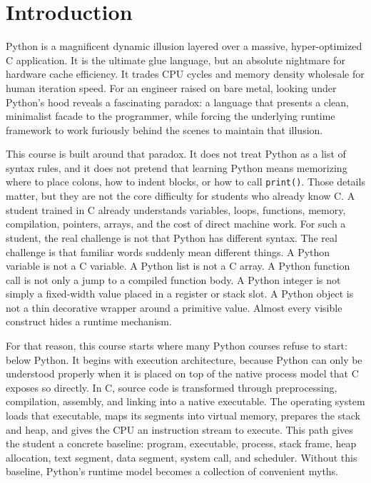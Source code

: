 \documentclass[a4paper,twoside]{report}
\begin{document}
\tableofcontents

\clearpage

\chapter{Introduction}

Python is a magnificent dynamic illusion layered over a massive, hyper-optimized C application. It is the ultimate glue language, but an absolute nightmare for hardware cache efficiency. It trades CPU cycles and memory density wholesale for human iteration speed. For an engineer raised on bare metal, looking under Python's hood reveals a fascinating paradox: a language that presents a clean, minimalist facade to the programmer, while forcing the underlying runtime framework to work furiously behind the scenes to maintain that illusion.

This course is built around that paradox. It does not treat Python as a list of syntax rules, and it does not pretend that learning Python means memorizing where to place colons, how to indent blocks, or how to call \texttt{print()}. Those details matter, but they are not the core difficulty for students who already know C. A student trained in C already understands variables, loops, functions, memory, compilation, pointers, arrays, and the cost of direct machine work. For such a student, the real challenge is not that Python has different syntax. The real challenge is that familiar words suddenly mean different things. A Python variable is not a C variable. A Python list is not a C array. A Python function call is not only a jump to a compiled function body. A Python integer is not simply a fixed-width value placed in a register or stack slot. A Python object is not a thin decorative wrapper around a primitive value. Almost every visible construct hides a runtime mechanism.

For that reason, this course starts where many Python courses refuse to start: below Python. It begins with execution architecture, because Python can only be understood properly when it is placed on top of the native process model that C exposes so directly. In C, source code is transformed through preprocessing, compilation, assembly, and linking into a native executable. The operating system loads that executable, maps its segments into virtual memory, prepares the stack and heap, and gives the CPU an instruction stream to execute. This path gives the student a concrete baseline: program, executable, process, stack frame, heap allocation, text segment, data segment, system call, and scheduler. Without this baseline, Python’s runtime model becomes a collection of convenient myths.
\end{document}
